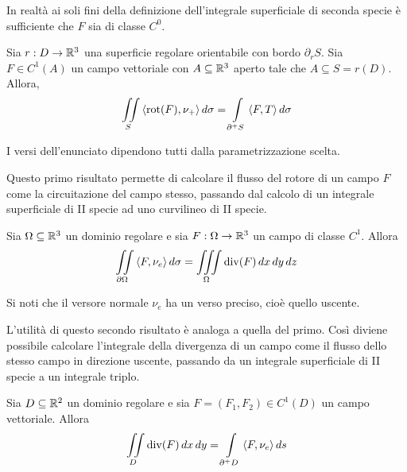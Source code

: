  \begin{oss}
     In realtà ai soli fini della definizione dell'integrale superficiale di seconda specie è sufficiente che $F$ sia di classe $C^0$.
 \end{oss}
  \begin{theorem} \label{Teo: Teorema di Stokes}
     Sia $r: D \to \mathbb{R}^3$ una superficie regolare orientabile con bordo $\partial_r S$. Sia $F \in C^1(A)$ un campo vettoriale con $A \subseteq \mathbb{R}^3$ aperto tale che $A \subseteq S=r(D)$. Allora,
     \begin{equation}
         \iint\limits_{S} {\langle \operatorname{rot}(F), \nu_+ \rangle}\, d\sigma = \int\limits_{\partial^+ S}{\langle F, T \rangle}\, d\sigma
     \end{equation}
 \end{theorem}
 \begin{oss}
     I versi dell'enunciato dipendono tutti dalla parametrizzazione scelta.
 \end{oss}
 Questo primo risultato permette di calcolare il flusso del rotore di un campo $F$ come la circuitazione del campo stesso, passando dal calcolo di un integrale superficiale di II specie ad uno curvilineo di II specie.
 \begin{theorem} \label{Teo: Teorema della divergenza}
     Sia $\Omega \subseteq \mathbb{R}^3$ un dominio regolare e sia $F: \Omega \to \mathbb{R}^3$ un campo di classe $C^1$. Allora
     \begin{equation}
         \iint\limits_{\partial \Omega}{\langle F, \nu_e\rangle}\, d\sigma = \iiint\limits_{\Omega}{\operatorname{div}(F)}\, dx\, dy\, dz
     \end{equation}
 \end{theorem}
 \begin{oss}
     Si noti che il versore normale $\nu_e$ ha un verso preciso, cioè quello uscente.
 \end{oss}
 L'utilità di questo secondo risultato è analoga a quella del primo. Così diviene possibile calcolare l'integrale della divergenza di un campo come il flusso dello stesso campo in direzione uscente, passando da un integrale superficiale di II specie a un integrale triplo.
 \begin{theorem}
     Sia $D \subseteq \mathbb{R}^2$ un dominio regolare e sia $F=(F_1, F_2) \in C^1(D)$ un campo vettoriale. Allora 
     \begin{equation}
         \iint\limits_{D} {\operatorname{div}(F)}\,dx\,dy = \int\limits_{\partial^+ D}{\langle F, \nu_e \rangle}\,ds
     \end{equation}
 \end{theorem}
